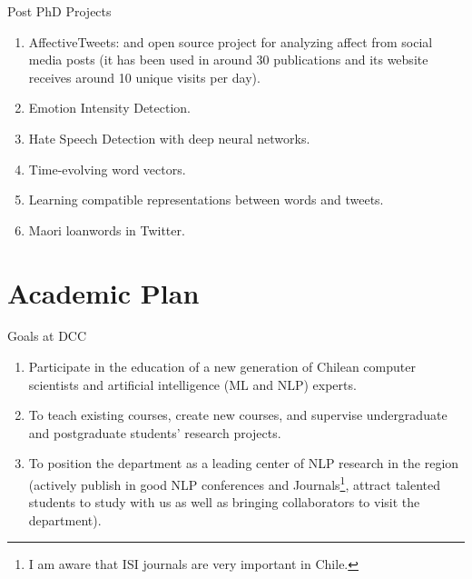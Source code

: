\documentclass[handout]{beamer}
\begin{document}
\begin{frame}{Post PhD Projects}

\begin{enumerate}
 \item AffectiveTweets: and open source project for analyzing affect from social media posts (it has been used in around 30 publications and its website receives around 10 unique visits per day).
 \item Emotion Intensity Detection.
 \item Hate Speech Detection with deep neural networks.
 \item Time-evolving word vectors.
 \item Learning compatible representations between words and tweets.
 \item Maori loanwords in Twitter.
 \end{enumerate}

\end{frame}





\section{Academic Plan}


\begin{frame}{Goals at DCC}
\begin{scriptsize}
  \begin{enumerate}
\item Participate in the education of a new generation of Chilean computer scientists and artificial intelligence (ML and NLP) experts.
\item To teach existing courses, create new courses, and supervise undergraduate and postgraduate students' research projects. 
\item To position the department as a leading  center of NLP research in the region (actively publish in good NLP conferences and Journals\footnote{I am aware that ISI journals are very important in Chile.}, attract talented students to study with us as well as bringing collaborators to visit the department).
  \end{enumerate} 
\end{scriptsize}

\end{frame}
\end{document}
